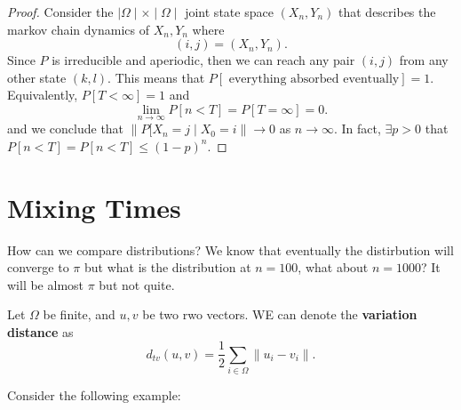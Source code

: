 \documentclass[a4paper]{article}
\begin{document}
\begin{proof}
    Consider the $\mid \Omega \mid  \times \mid \Omega \mid $  joint state space $(X_n ,Y_n)$ that describes the markov chain dynamics of $X_n, Y_n$ where
    \[
      (i,j) = \left( X_n, Y_n \right) 
    .\]
    Since $P$ is irreducible and aperiodic, then we can reach any pair  $(i,j)$ from any other state  $(k,l)$. This means that  $P[\text{ everything absorbed eventually}] = 1$. Equivalently, $P[T < \infty] = 1$ and 
     \[
       \lim_{n \to \infty} P[n < T] = P[T= \infty] = 0
    .\] 
    and we conclude that $ \|P[X_n = j\mid  X_0 =i\| \to 0$ as $n \to \infty$. In fact,  $\exists p > 0$ that $P[n < T] = P[n < T] \leq (1-p)^{n}$.
  \end{proof}

\section{Mixing Times}
\begin{note}
  How can we compare distributions? We know that eventually the distirbution will converge to $\pi$ but what is the distribution at $n=100$, what about  $n=1000$? It will be almost  $\pi$ but not quite. 
\end{note}
\begin{definition}
  Let $\Omega$ be finite, and  $u,v$ be two rwo vectors. WE can denote the \textbf{variation distance} as
  \[
  d_{t v} (u, v) = \frac{1}{2} \sum_{i \in \Omega} \|u_i - v_i\|
  .\] 
\end{definition}
Consider the following example:
\end{document}
